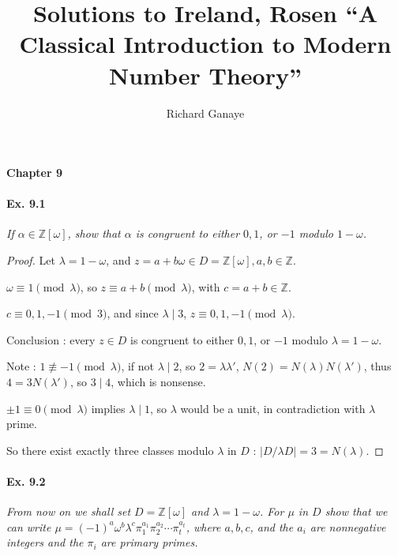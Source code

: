 \documentclass[11pt,a4paper]{article}
\title{Solutions to Ireland, Rosen ``A Classical Introduction to Modern Number Theory''}
\author{Richard Ganaye}
\newcommand{\Z}{\mathbb{Z}}
\begin{document}
\maketitle


{ \Large \bf Chapter 9} 

\paragraph{Ex. 9.1}

{\it If $\alpha \in \Z[\omega]$, show that $\alpha$ is congruent to either $0,1$, or $-1$ modulo $1-\omega$.
}

\begin{proof}
Let $\lambda = 1 - \omega$, and $z = a+b\omega \in D = \Z[\omega], a,b \in \Z$.

$\omega \equiv 1 \pmod \lambda$, so $z \equiv a+b \pmod \lambda$, with $c = a+b \in \Z$.

$c\equiv 0,1,-1 \pmod 3$, and since $\lambda \mid 3$, $z \equiv 0,1,-1 \pmod \lambda$.

Conclusion : every $z \in D$ is congruent to either $0,1$, or $-1$ modulo $\lambda = 1 -\omega$.

Note :  $1\not \equiv -1 \pmod \lambda$, if not $\lambda \mid 2$, so $2 = \lambda \lambda'$, $N(2) = N(\lambda) N(\lambda')$, thus $4 = 3 N(\lambda')$, so $3 \mid 4$, which is nonsense.

$\pm1 \equiv 0 \pmod \lambda$ implies $\lambda \mid 1$, so $\lambda$ would be a unit, in contradiction with $\lambda$ prime.

So there exist exactly three classes modulo $\lambda$ in $D$ : $ | D/\lambda D | = 3 = N(\lambda)$.

\end{proof}

\paragraph{Ex. 9.2}

{\it From now on we shall set $D = \Z[\omega]$ and $\lambda = 1 - \omega$. For $\mu$ in $D$ show that we can write $\mu = (-1)^a \omega^b \lambda^c\pi_1^{a_1}\pi_2^{a_2}\cdots\pi_t^{a_t}$, where $a,b,c$, and the $a_i$ are nonnegative integers and the $\pi_i$ are primary primes.
}
\end{document}
